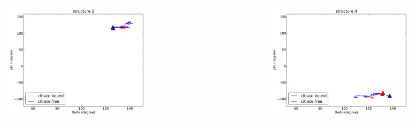 \documentclass[english]{beamer}
\begin{document}
\begin{frame}
\begin{columns}[t]
        \vspace{-4ex}
        \begin{figure}
            \includegraphics[width=0.85\textwidth]{figures/Complex_trajectory/collecitve_coords_structure2.pdf}  
        \end{figure}      
        \vspace{-5ex}
        \begin{figure}
            \includegraphics[width=0.85\textwidth]{figures/Complex_trajectory/collecitve_coords_structure4.pdf}   
        \end{figure}       

    \end{columns}   
    
\end{frame}        

\end{document}

